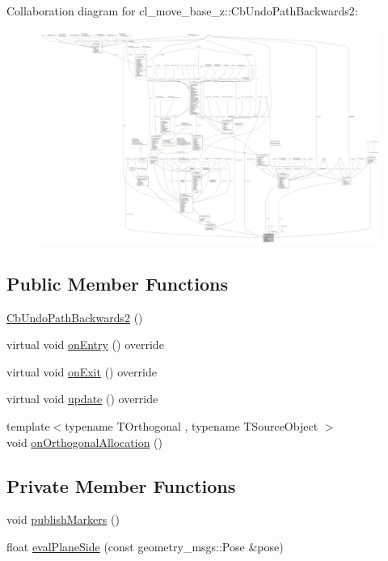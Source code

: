 Collaboration diagram for cl\+\_\+move\+\_\+base\+\_\+z\+:\+:Cb\+Undo\+Path\+Backwards2\+:
\nopagebreak
\begin{figure}[H]
\begin{center}
\leavevmode
\includegraphics[width=350pt]{classcl__move__base__z_1_1CbUndoPathBackwards2__coll__graph}
\end{center}
\end{figure}
\subsection*{Public Member Functions}
\begin{DoxyCompactItemize}
\item 
\hyperlink{classcl__move__base__z_1_1CbUndoPathBackwards2_a0f202bf7a4b1cc1db426a0c2ad1434f6}{Cb\+Undo\+Path\+Backwards2} ()
\item 
virtual void \hyperlink{classcl__move__base__z_1_1CbUndoPathBackwards2_a1b96187df9be6ce0fbdb5511147685d3}{on\+Entry} () override
\item 
virtual void \hyperlink{classcl__move__base__z_1_1CbUndoPathBackwards2_ae493fcd813176d8473ff08680beb7afe}{on\+Exit} () override
\item 
virtual void \hyperlink{classcl__move__base__z_1_1CbUndoPathBackwards2_a62f0d53fc341ca6d241637cc0e4b2e30}{update} () override
\item 
{\footnotesize template$<$typename T\+Orthogonal , typename T\+Source\+Object $>$ }\\void \hyperlink{classcl__move__base__z_1_1CbUndoPathBackwards2_a61148b9509b489efc382ecdeb9bcf9c2}{on\+Orthogonal\+Allocation} ()
\end{DoxyCompactItemize}
\subsection*{Private Member Functions}
\begin{DoxyCompactItemize}
\item 
void \hyperlink{classcl__move__base__z_1_1CbUndoPathBackwards2_afaa039c78eb70ba012d86d8c77b9828c}{publish\+Markers} ()
\item 
float \hyperlink{classcl__move__base__z_1_1CbUndoPathBackwards2_a20b9a6799b0484810b0319f5a97d020e}{eval\+Plane\+Side} (const geometry\+\_\+msgs\+::\+Pose \&pose)
\end{DoxyCompactItemize}
